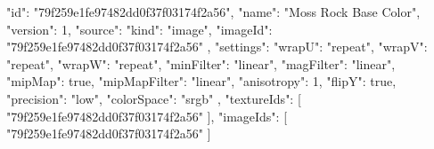 {
  "id": "79f259e1fe97482dd0f37f03174f2a56",
  "name": "Moss Rock Base Color",
  "version": 1,
  "source": {
    "kind": "image",
    "imageId": "79f259e1fe97482dd0f37f03174f2a56"
  },
  "settings": {
    "wrapU": "repeat",
    "wrapV": "repeat",
    "wrapW": "repeat",
    "minFilter": "linear",
    "magFilter": "linear",
    "mipMap": true,
    "mipMapFilter": "linear",
    "anisotropy": 1,
    "flipY": true,
    "precision": "low",
    "colorSpace": "srgb"
  },
  "textureIds": [
    "79f259e1fe97482dd0f37f03174f2a56"
  ],
  "imageIds": [
    "79f259e1fe97482dd0f37f03174f2a56"
  ]
}
